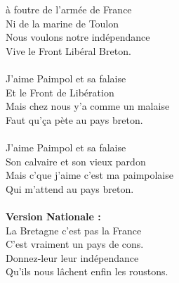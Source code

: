 
 à foutre de l'armée de France
\\Ni de la marine de Toulon
\\Nous voulons notre indépendance
\\Vive le Front Libéral Breton.
\\\\J'aime Paimpol et sa falaise
\\Et le Front de Libération
\\Mais chez nous y'a comme un malaise
\\Faut qu'ça pète au pays breton.
\\\\J'aime Paimpol et sa falaise
\\Son calvaire et son vieux pardon
\\Mais c'que j'aime c'est ma paimpolaise
\\Qui m'attend au pays breton.
\\\\\textbf{Version Nationale :}
\\La Bretagne c'est pas la France
\\C'est vraiment un pays de cons.
\\Donnez-leur leur indépendance
\\Qu'ils nous lâchent enfin les roustons.

\breakpage